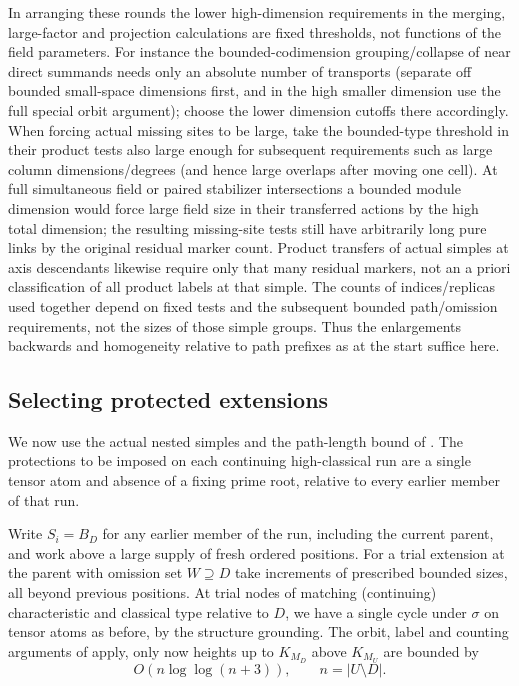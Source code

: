 \begin{remark}\label{fb:uniform-thresholds}

In arranging these rounds the lower high-dimension requirements in the merging, large-factor and projection calculations are fixed thresholds, not functions of the field parameters. For instance the bounded-codimension grouping/collapse of near direct summands needs only an absolute number of transports (separate off bounded small-space dimensions first, and in the high smaller dimension use the full special orbit argument); choose the lower dimension cutoffs there accordingly. When forcing actual missing sites to be large, take the bounded-type threshold in their product tests also large enough for subsequent requirements such as large column dimensions/degrees (and hence large overlaps after moving one cell). At full simultaneous field or paired stabilizer intersections a bounded module dimension would force large field size in their transferred actions by the high total dimension; the resulting missing-site tests still have arbitrarily long pure links by the original residual marker count. Product transfers of actual simples at axis descendants likewise require only that many residual markers, not an a priori classification of all product labels at that simple. The counts of indices/replicas used together depend on fixed tests and the subsequent bounded path/omission requirements, not the sizes of those simple groups. Thus the enlargements backwards and homogeneity relative to path prefixes as at the start suffice here.

\end{remark}

\subsection{Selecting protected extensions}\label{fb:protection-setup}
We now use the actual nested simples and the path-length bound of
.  The protections to be imposed on each
continuing high-classical run are a single tensor atom and absence of a
fixing prime root, relative to every earlier member of that run.

Write \(S_i=B_D\) for any earlier member of the run, including the
current parent, and work above a large supply of fresh ordered
positions. For a trial extension at the parent with omission set \(W\supseteq D\) take increments of prescribed bounded sizes, all beyond previous positions. At trial nodes of matching (continuing) characteristic and classical type relative to \(D\), we have a single cycle under \(\sigma\) on tensor atoms as before, by the structure grounding. The orbit, label and counting arguments of  apply, only now heights up to \(K_{M_D}\) above \(K_{M_U}\) are bounded by
\[
             O(n\log\log(n+3)),\qquad n=|U\setminus D|.
\]

